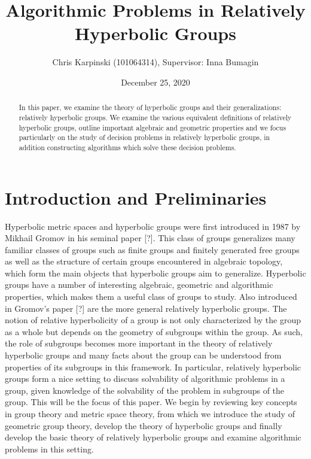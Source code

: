 \documentclass[12pt]{article}
\title{Algorithmic Problems in Relatively Hyperbolic Groups}
\author{Chris Karpinski (101064314), Supervisor: Inna Bumagin}
\date{December 25, 2020}
\begin{document}
	
	\maketitle
	
	\begin{abstract}
		
		In this paper, we examine the theory of hyperbolic groups and their generalizations: relatively hyperbolic groups. We examine the various equivalent definitions of relatively hyperbolic groups, outline important algebraic and geometric properties and we focus particularly on the study of decision problems in relatively hyperbolic groups, in addition constructing algorithms which solve these decision problems. 
		
	\end{abstract}
	
	\tableofcontents
	\section{Introduction and Preliminaries}
	
	Hyperbolic metric spaces and hyperbolic groups were first introduced in 1987 by Mikhail Gromov in his seminal paper [?]. This class of groups generalizes many familiar classes of groups such as finite groups and finitely generated free groups as well as the structure of certain groups encountered in algebraic topology, which form the main objects that hyperbolic groups aim to generalize. Hyperbolic groups have a number of interesting algebraic, geometric and algorithmic properties, which makes them a useful class of groups to study. Also introduced in Gromov's paper [?] are the more general relatively hyperbolic groups. The notion of relative hyperbolicity of a group is not only characterized by the group as a whole but depends on the geometry of subgroups within the group. As such, the role of subgroups becomes more important in the theory of relatively hyperbolic groups and many facts about the group can be understood from properties of its subgroups in this framework. In particular, relatively hyperbolic groups form a nice setting to discuss solvability of algorithmic problems in a group, given knowledge of the solvability of the problem in subgroups of the group. This will be the focus of this paper. We begin by reviewing key concepts in group theory and metric space theory, from which we introduce the study of geometric group theory, develop the theory of hyperbolic groups and finally develop the basic theory of relatively hyperbolic groups and examine algorithmic problems in this setting. 
	
\end{document}
